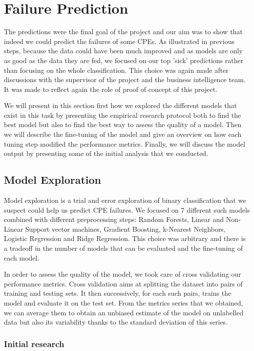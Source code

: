 \section{Failure Prediction}
The predictions were the final goal of the project and our aim was to show that indeed we could predict the failures of some CPEs. As illustrated in previous steps, because the data could have been much improved and as models are only as good as the data they are fed, we focused on our top 'sick' predictions rather than focusing on the whole classification. This choice was again made after discussions with the supervisor of the project and the business intelligence team. It was made to reflect again the role of proof of concept of this project. 

We will present in this section first how we explored the different models that exist in this task by presenting the empirical research protocol both to find the best model but also to find the best way to assess the quality of a model. Then we will describe the fine-tuning of the model and give an overview on how each tuning step modified the performance metrics. Finally, we will discuss the model output by presenting some of the initial analysis that we conducted. 

\subsection{Model Exploration}
Model exploration is a trial and error exploration of binary classification that we suspect could help us predict CPE failures. We focused on 7 different such models combined with different preprocessing steps: Random Forests, Linear and Non-Linear Support vector machines, Gradient Boosting, k-Nearest Neighbors, Logistic Regression and Ridge Regression. This choice was arbitrary and there is a tradeoff in the number of models that can be evaluated and the fine-tuning of each model. 

In order to assess the quality of the model, we took care of cross validating our performance metrics. Cross validation aims at splitting the dataset into pairs of training and testing sets. It then successively, for each such pairs, trains the model and evaluate it on the test set. From the metrics series that we obtained, we can average them to obtain an unbiased estimate of the model on unlabelled data but also its variability thanks to the standard deviation of this series. 

\subsubsection{Initial research}
